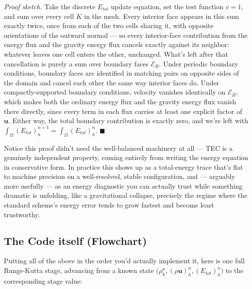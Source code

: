 \emph{Proof sketch.} Take the discrete $E_{tot}$ update equation, set the test function $v=1$, and sum over every cell $K$ in the mesh. Every interior face appears in this sum exactly twice, once from each of the two cells sharing it, with opposite orientations of the outward normal — so every interior-face contribution from the energy flux and the gravity energy flux cancels exactly against its neighbor: whatever leaves one cell enters the other, unchanged. What's left after that cancellation is purely a sum over boundary faces $\mathcal{E}_B$. Under periodic boundary conditions, boundary faces are identified in matching pairs on opposite sides of the domain and cancel each other the same way interior faces do. Under compactly-supported boundary conditions, velocity vanishes identically on $\mathcal{E}_B$, which makes both the ordinary energy flux and the gravity energy flux vanish there directly, since every term in each flux carries at least one explicit factor of $\mathbf{u}$. Either way, the total boundary contribution is exactly zero, and we're left with $\int_\Omega (E_{tot})_h^{n+1} = \int_\Omega (E_{tot})_h^n$. $\blacksquare$

Notice this proof didn't need the well-balanced machinery at all — TEC is a genuinely independent property, coming entirely from writing the energy equation in conservative form. In practice this shows up as a total-energy trace that's flat to machine precision on a well-resolved, stable configuration, and — arguably more usefully — as an energy diagnostic you can actually trust while something dramatic is unfolding, like a gravitational collapse, precisely the regime where the standard scheme's energy error tends to grow fastest and become least trustworthy.

\subsection{The Code itself (Flowchart)}

Putting all of the above in the order you'd actually implement it, here is one full Runge-Kutta stage, advancing from a known state $\big(\rho_h^n, (\rho\mathbf{u})_h^n, (E_{tot})_h^n\big)$ to the corresponding stage value:

